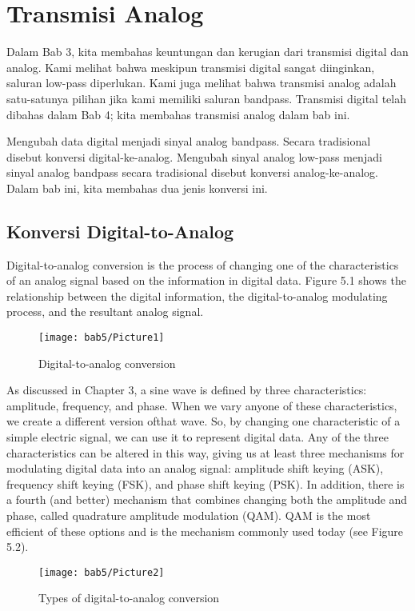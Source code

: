 \chapter{Transmisi Analog}
Dalam Bab 3, kita membahas keuntungan dan kerugian dari transmisi digital dan analog. Kami melihat bahwa meskipun transmisi digital sangat diinginkan, saluran low-pass diperlukan. Kami juga melihat bahwa transmisi analog adalah satu-satunya pilihan jika kami memiliki saluran bandpass. Transmisi digital telah dibahas dalam Bab 4; kita membahas transmisi analog dalam bab ini. 

Mengubah data digital menjadi sinyal analog bandpass. Secara tradisional disebut konversi digital-ke-analog. Mengubah sinyal analog low-pass menjadi sinyal analog bandpass secara tradisional disebut konversi analog-ke-analog. Dalam bab ini, kita membahas dua jenis konversi ini.

\section{Konversi Digital-to-Analog}
Digital-to-analog conversion is the process of changing one of the characteristics of an analog signal based on the information in digital data. Figure 5.1 shows the relationship between the digital information, the digital-to-analog modulating process, and the resultant analog signal.

\begin{figure}[htbp]
  \centering
  \texttt{[image: bab5/Picture1]}
  \caption{Digital-to-analog conversion}
  \label{fig5:1}
\end{figure}

As discussed in Chapter 3, a sine wave is defined by three characteristics: amplitude, frequency, and phase. When we vary anyone of these characteristics, we create a different version ofthat wave. So, by changing one characteristic of a simple electric signal, we can use it to represent digital data. Any of the three characteristics can be altered in this way, giving us at least three mechanisms for modulating digital data into an analog signal: amplitude shift keying (ASK), frequency shift keying (FSK), and phase shift keying (PSK). In addition, there is a fourth (and better) mechanism that combines changing both the amplitude and phase, called quadrature amplitude modulation (QAM). QAM is the most efficient of these options and is the mechanism commonly used today (see Figure 5.2).

\begin{figure}[htbp]
  \centering
  \texttt{[image: bab5/Picture2]}
  \caption{Types of digital-to-analog conversion}
  \label{fig5:2}
\end{figure}

